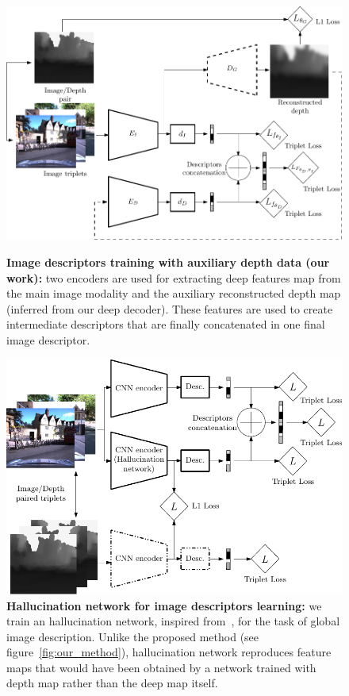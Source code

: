 \begin{figure}
	\begin{minipage}{0.49\linewidth}
		\center
		\includegraphics[width=\linewidth]{method/our_method_training}
		\caption[Image descriptors training with auxiliary depth data]{\label{fig:our_method} \textbf{Image descriptors training with auxiliary depth data (our work):} two encoders are used for extracting deep features map from the main image modality and the auxiliary reconstructed depth map (inferred from our deep decoder). These features are used to create intermediate descriptors that are finally concatenated in one final image descriptor.}	
	\end{minipage}\hfill
	\begin{minipage}{0.49\linewidth}
		\center
		\includegraphics[width=\linewidth]{method/hall_method_training}
		\caption[Hallucination network for image descriptors learning]{\label{fig:hall_method} \textbf{Hallucination network for image descriptors learning:} we train an hallucination network, inspired from~\cite{Hoffman2016}, for the task of global image description. Unlike the proposed method (see figure~\ref{fig:our_method}), hallucination network reproduces feature maps that would have been obtained by a network trained with depth map rather than the deep map itself.}
	\end{minipage}
	
\end{figure}
	